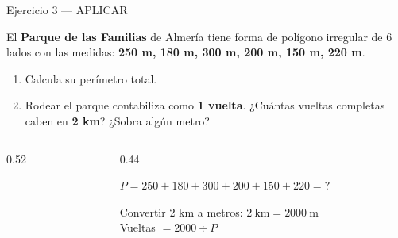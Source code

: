 \documentclass[aspectratio=169, 10pt, spanish]{beamer}
\begin{document}

\begin{frame}{Ejercicio 3 — APLICAR }
  \begin{aplicarbox}
    \AlmFontSmall El \textbf{Parque de las Familias} de Almería tiene forma
    de polígono irregular de 6 lados con las medidas:
    \textbf{250 m, 180 m, 300 m, 200 m, 150 m, 220 m}.

    \begin{enumerate}
      \item Calcula su perímetro total.
      \item Rodear el parque contabiliza como \textbf{1 vuelta}.
            ¿Cuántas vueltas completas caben en \textbf{2 km}?
            ¿Sobra algún metro?
    \end{enumerate}
  \end{aplicarbox}

  \vspace{0.2cm}
  \begin{columns}[c]
    \begin{column}{0.52\textwidth}
      \begin{center}
      \end{center}
    \end{column}
    \begin{column}{0.44\textwidth}
      \begin{pasobox}[1]
        \AlmFontScript $P = 250 + 180 + 300 + 200 + 150 + 220 = ?$
      \end{pasobox}
      \vspace{0.2cm}
      \begin{pasobox}[2]
        \AlmFontScript Convertir 2 km a metros: $2\ \text{km} = 2000\ \text{m}$
        \\Vueltas $= 2000 \div P$
      \end{pasobox}
    \end{column}
  \end{columns}
\end{frame}
\end{document}
